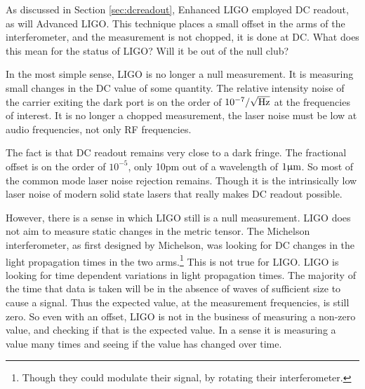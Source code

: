 As discussed in Section \ref{sec:dcreadout}, Enhanced LIGO employed DC readout, as will Advanced LIGO. %
This technique places a small offset in the arms of the interferometer, and the measurement is not chopped, it is done at DC. %
What does this mean for the status of LIGO? %
Will it be out of the null club?

In the most simple sense, LIGO is no longer a null measurement. %
It is measuring small changes in the DC value of some quantity. %
The relative intensity noise of the carrier exiting the dark port is on the order of $10^{-7}/\sqrt{\rm{Hz}}$ at the frequencies of interest. %
It is no longer a chopped measurement, the laser noise must be low at audio frequencies, not only RF frequencies.

The fact is that DC readout remains very close to a dark fringe. %
The fractional offset is on the order of $10^{-5}$, only 10pm out of a wavelength of $1\upmu \rm m$. %
So most of the common mode laser noise rejection remains. %
Though it is the intrinsically low laser noise of modern solid state lasers that really makes DC readout possible.

However, there is a sense in which LIGO still is a null measurement. %
LIGO does not aim to measure static changes in the metric tensor. %
The Michelson interferometer, as first designed by Michelson, was looking for DC changes in the light propagation times in the two arms.\footnote{Though they could modulate their signal, by rotating their interferometer.} This is not true for LIGO. %
LIGO is looking for time dependent variations in light propagation times. %
The majority of the time that data is taken will be in the absence of waves of sufficient size to cause a signal. %
Thus the expected value, at the measurement frequencies, is still zero. %
So even with an offset, LIGO is not in the business of measuring a non-zero value, and checking if that is the expected value. %
In a sense it is measuring a value many times and seeing if the value has changed over time.
